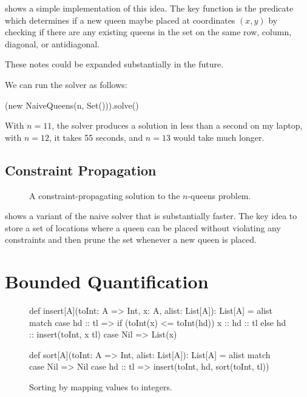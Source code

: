 \documentclass[9pt]{extbook}
\begin{document}
 shows a simple implementation of this idea. The key function
is the  predicate which determines if a new queen
maybe placed at coordinates $(x,y)$ by checking if there are any existing
queens in the set  on the same row, column, diagonal,
or antidiagonal.

\begin{instructor}
These notes could be expanded substantially in the future.
\end{instructor}

We can run the solver as follows:

\begin{scalacode}
(new NaiveQueens(n, Set())).solve()
\end{scalacode}
With $n = 11$, the solver produces a solution in less than a second on my
laptop, with $n = 12$, it takes 55 seconds, and $n = 13$ would take much longer.

\section{Constraint Propagation}

\begin{figure}
\caption{A constraint-propagating solution to the $n$-queens problem.}
\label{OptQueens}
\end{figure}

 shows a variant of the naive solver that is substantially
faster. The key idea to store a set of locations where a queen can be placed
without violating any constraints and then prune the set whenever a new queen
is placed.

\chapter{Bounded Quantification}

\begin{figure}
\begin{scalacode}
def insert[A](toInt: A => Int, x: A, alist: List[A]): List[A] = alist match {
  case hd :: tl => if (toInt(x) <= toInt(hd)) { x :: hd :: tl } else { hd :: insert(toInt, x tl) }
  case Nil => List(x)
}

def sort[A](toInt: A => Int, alist: List[A]): List[A] = alist match {
  case Nil => Nil
  case hd :: tl => insert(toInt, hd, sort(toInt, tl))
}
\end{scalacode}
\caption{Sorting by mapping values to integers.}
\label{sortToIntHOF}
\end{figure}
\end{document}
